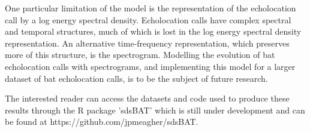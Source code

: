 \documentclass{ws-rv9x6}
\begin{document}
One particular limitation of the model is the representation of the echolocation call by a log energy spectral density. Echolocation calls have complex spectral and temporal structures, much of which is lost in the log energy spectral density representation. An alternative time-frequency representation, which preserves more of this structure, is the spectrogram. Modelling the evolution of bat echolocation calls with spectrograms, and implementing this model for a larger dataset of bat echolocation calls, is to be the subject of future research.

The interested reader can access the datasets and code used to produce these results through the R package 'sdsBAT' which is still under development and can be found at https://github.com/jpmeagher/sdsBAT.



\end{document}
